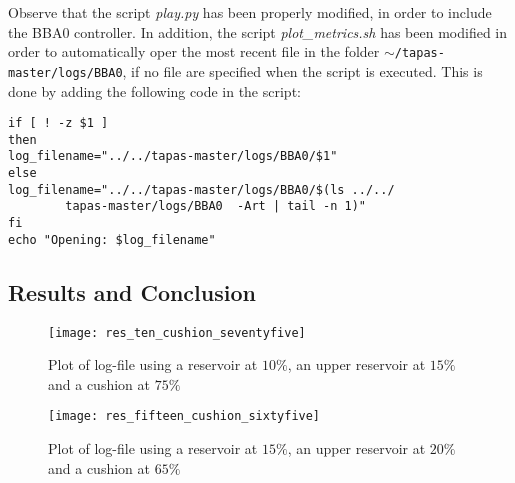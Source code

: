 \documentclass[a4paper]{report}
\begin{document}
Observe that the script \textit{play.py} has been properly modified, in order to include the BBA0 controller.
In addition, the script \textit{plot\_metrics.sh} has been modified in order to automatically oper the most recent file in the folder \texttt{$\sim$\slash tapas-master\slash logs\slash BBA0}, if no file are specified when the script is executed. This is done by adding the following code in the script:

\begin{Verbatim}
if [ ! -z $1 ]
then
log_filename="../../tapas-master/logs/BBA0/$1"
else
log_filename="../../tapas-master/logs/BBA0/$(ls ../../
		tapas-master/logs/BBA0  -Art | tail -n 1)"
fi
echo "Opening: $log_filename"
\end{Verbatim}


\subsection{Results and Conclusion}

\begin{figure}[H]
  \begin{center}
    \texttt{[image: res\_ten\_cushion\_seventyfive]}
  \end{center}
  \caption{Plot of log-file using a reservoir at $10\%$, an upper reservoir at $15\%$ and a cushion at $75\%$}\label{resten}
\end{figure}

\begin{figure}[H]
  \begin{center}
    \texttt{[image: res\_fifteen\_cushion\_sixtyfive]}
  \end{center}
  \caption{Plot of log-file using a reservoir at $15\%$, an upper reservoir at $20\%$ and a cushion at $65\%$}\label{resfifteen}
\end{figure}





\end{document}
